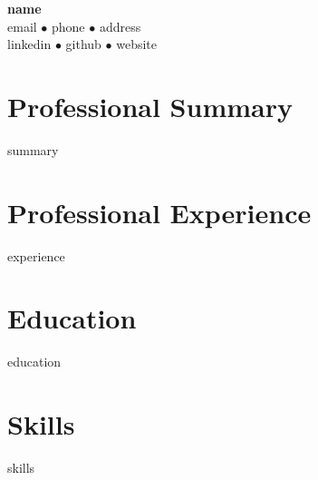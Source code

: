 \documentclass[11pt,a4paper]{article}
\begin{document}
\begin{center}
{\Huge\bfseries\color{darkblue} {{name}}}\\[0.5em]
{{email}} $\bullet$ {{phone}} $\bullet$ {{address}}\\
{{linkedin}} $\bullet$ {{github}} $\bullet$ {{website}}
\end{center}

\section{Professional Summary}
{{summary}}

\section{Professional Experience}
{{experience}}

\section{Education}
{{education}}

\section{Skills}
{{skills}}
\end{document}
